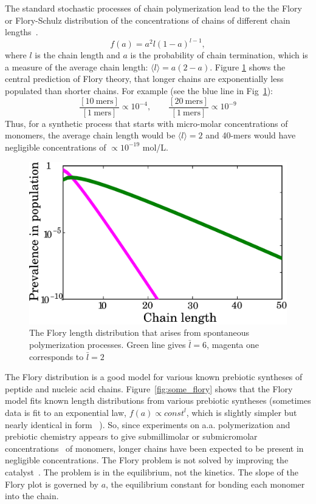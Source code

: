 \documentclass[journal=jacsat,manuscript=article,layout=twocolumn]{achemso}
\newcommand*{\pq}[1]{\left[ #1 \right]}
\begin{document}
The standard stochastic processes of chain polymerization lead to the the Flory or 
Flory-Schulz distribution of the concentrations of chains of different chain 
lengths~\cite{Flory1953}. 
\begin{equation}
 f(a)=a^2l(1-a)^{l-1},
\end{equation} 
where $l$ is the chain length and $a$ is the probability of chain termination, 
which is a measure of the average chain length: $\langle l \rangle = a(2- a)$.
Figure \ref{fig:flory} shows the central prediction of Flory theory, that 
longer chains are exponentially less populated than shorter chains.  For example (see the blue line 
in Fig~\ref{fig:flory}):
\begin{equation}  
\frac{\pq{10~\mathrm{mers}}}{\pq{1~\mathrm{mers}}}\propto10^{-4},\qquad\frac{\pq{20~\mathrm{mers}}}{
\pq{1~\mathrm{mers}}}\propto10^{-9}
\end{equation} 
Thus, for a synthetic process that starts with micro-molar concentrations of monomers, the 
average chain length would be $\langle l \rangle = 2$ and 40-mers would have 
negligible concentrations of $\propto 10^{-19} $ mol/L. 
\begin{figure}[h!]
  \centering
  \includegraphics[width=\columnwidth]{pictures/flory2.pdf} 
  \caption{The Flory length distribution that arises from spontaneous polymerization processes. 
Green line gives $\bar l = 6$, magenta one corresponds to $\bar l =2$}
  \label{fig:flory}
\end{figure}

The Flory distribution is a good model for various known prebiotic syntheses of peptide and nucleic 
acid chains.  Figure~\ref{fig:some_flory} shows that the Flory model fits known length 
distributions from various prebiotic syntheses (sometimes data is fit to an exponential law, 
$f(a)\propto 
const^l$, which is slightly simpler but nearly identical in form 
~\cite{nowak2008prevolutionary,Derr2012}).  So, since experiments on a.a. polymerization and 
prebiotic chemistry appears to give submillimolar or submicromolar 
concentrations~\cite{Stribling1987,Huber1998,Aubrey2009,Kanavarioti2001,Lazcano1996} of monomers, 
longer chains have been expected to be present in negligible concentrations.  The Flory problem is 
not solved by improving the catalyst~\cite{Derr2012}. The problem is in the equilibrium, not the 
kinetics.  The slope of the Flory plot is governed by $a$, the equilibrium constant for bonding 
each 
monomer into the chain.
\end{document}
